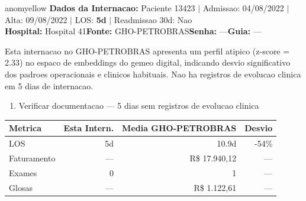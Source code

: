 \documentclass[a4paper,10pt]{article}
\begin{document}
\begin{anomalycard}[Internacao 14434 | GHO-PETROBRAS | MODERADO (z=2.33)]{anomyellow}
\textbf{Dados da Internacao:} Paciente 13423 $\mid$ Admissao: 04/08/2022 $\mid$ Alta: 09/08/2022 $\mid$ LOS: \textbf{5d} $\mid$ Readmissao 30d: Nao\\
\textbf{Hospital:} Hospital 41\quad\textbf{Fonte:} GHO-PETROBRAS\quad\textbf{Senha:} ---\quad\textbf{Guia:} ---\\
\vspace{2pt}\begin{tcolorbox}[colback=severityred!20,colframe=anomyellow,title={\textbf{Interpretacao de Negocio}},fonttitle=\bfseries\small,left=4pt,right=4pt,top=3pt,bottom=3pt]
{\small Esta internacao no GHO-PETROBRAS apresenta um perfil atipico (z-score = 2.33) no espaco de embeddings do gemeo digital, indicando desvio significativo dos padroes operacionais e clinicos habituais. Nao ha registros de evolucao clinica em 5 dias de internacao.}
\end{tcolorbox}
\begin{tcolorbox}[colback=severityyellow!30,colframe=anomorange,title={\textbf{Recomendacoes Especificas}},fonttitle=\bfseries\small,left=4pt,right=4pt,top=3pt,bottom=3pt]
\begin{enumerate}[nosep,leftmargin=16pt]
\item {\small Verificar documentacao --- 5 dias sem registros de evolucao clinica}
\end{enumerate}
\end{tcolorbox}
\begin{center}\begin{tabular}{l r r r}\toprule\textbf{Metrica} & \textbf{Esta Intern.} & \textbf{Media GHO-PETROBRAS} & \textbf{Desvio} \\\midrule
LOS & 5d & 10.9d & -54\% \\
Faturamento & --- & R\$ 17.940,12 & --- \\
Exames & 0 & 1 & --- \\
Glosas & --- & R\$ 1.122,61 & --- \\
\bottomrule\end{tabular}\end{center}


\end{anomalycard}
\end{document}
